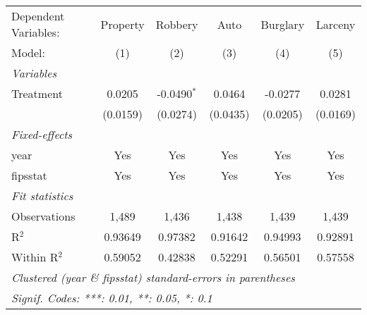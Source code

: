
\begingroup
\centering
\begin{tabular}{lccccc}
   \tabularnewline \midrule \midrule
   Dependent Variables: & Property & Robbery       & Auto     & Burglary & Larceny\\  
   Model:               & (1)      & (2)           & (3)      & (4)      & (5)\\  
   \midrule
   \emph{Variables}\\
   Treatment            & 0.0205   & -0.0490$^{*}$ & 0.0464   & -0.0277  & 0.0281\\   
                        & (0.0159) & (0.0274)      & (0.0435) & (0.0205) & (0.0169)\\   
   \midrule
   \emph{Fixed-effects}\\
   year                 & Yes      & Yes           & Yes      & Yes      & Yes\\  
   fipsstat             & Yes      & Yes           & Yes      & Yes      & Yes\\  
   \midrule
   \emph{Fit statistics}\\
   Observations         & 1,489    & 1,436         & 1,438    & 1,439    & 1,439\\  
   R$^2$                & 0.93649  & 0.97382       & 0.91642  & 0.94993  & 0.92891\\  
   Within R$^2$         & 0.59052  & 0.42838       & 0.52291  & 0.56501  & 0.57558\\  
   \midrule \midrule
   \multicolumn{6}{l}{\emph{Clustered (year \& fipsstat) standard-errors in parentheses}}\\
   \multicolumn{6}{l}{\emph{Signif. Codes: ***: 0.01, **: 0.05, *: 0.1}}\\
\end{tabular}
\par\endgroup



